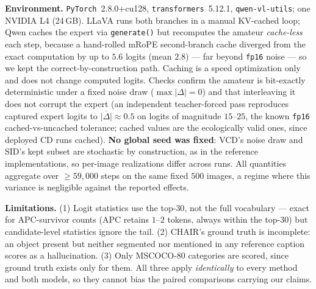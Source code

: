 \textbf{Environment.} \texttt{PyTorch}~2.8.0+cu128,
\texttt{transformers}~5.12.1, \texttt{qwen-vl-utils}; one NVIDIA L4 (24\,GB).
LLaVA runs both branches in a manual KV-cached loop; Qwen caches the expert via
\texttt{generate()} but recomputes the amateur \emph{cache-less} each step,
because a hand-rolled mRoPE second-branch cache diverged from the exact
computation by up to $5.6$ logits (mean $2.8$) --- far beyond \texttt{fp16}
noise --- so we kept the correct-by-construction path. Caching is a speed
optimization only and does not change computed logits. Checks confirm the
amateur is bit-exactly deterministic under a fixed noise draw
($\max|\Delta|=0$) and that interleaving it does not corrupt the expert (an
independent teacher-forced pass reproduces captured expert logits to
$\overline{|\Delta|}\approx0.5$ on logits of magnitude $15$--$25$, the known
\texttt{fp16} cached-vs-uncached tolerance; cached values are the ecologically
valid ones, since deployed CD runs cached). \textbf{No global seed was fixed}:
VCD's noise draw and SID's kept subset are stochastic by construction, as in the
reference implementations, so per-image realizations differ across runs. All
quantities aggregate over $\ge59{,}000$ steps on the same fixed $500$ images, a
regime where this variance is negligible against the reported effects.

\textbf{Limitations.} (1) Logit statistics use the top-$30$, not the full
vocabulary --- exact for APC-survivor counts (APC retains $1$--$2$ tokens,
always within the top-$30$) but candidate-level statistics ignore the tail.
(2) CHAIR's ground truth is incomplete: an object present but neither segmented
nor mentioned in any reference caption scores as a hallucination. (3) Only
MSCOCO-80 categories are scored, since ground truth exists only for them. All
three apply \emph{identically} to every method and both models, so they cannot
bias the paired comparisons carrying our claims.
